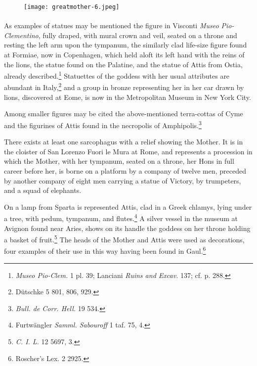 \documentclass[a4paper, 11pt, oneside, polutonikogreek, english]{article}
\begin{document}
\clearpage
\begin{landscape}
\begin{figure}[H]
\centering
\texttt{[image: greatmother-6.jpeg]}
\caption{}
\end{figure}
\end{landscape}
\clearpage
\paragraph{}
As examples of statues may be mentioned the figure in Visconti \emph{Museo Pio-Clementino}, fully draped, with mural crown and veil, seated on a throne and resting the left arm upon the tympanum, the similarly clad life-size figure found at Formiae, now in Copenhagen, which held aloft its left hand with the reins of the lions, the statue found on the Palatine, and the statue of Attis from Ostia, already described.\footnote{\emph{Museo Pio-Clem.} 1 pl. 39; Lanciani \emph{Ruins and Excav.} 137; cf. p. 288.} Statuettes of the goddess with her usual attributes are abundant in Italy,\footnote{Dütschke 5 801, 806, 929.} and a group in bronze representing her in her car drawn by lions, discovered at Eome, is now in the Metropolitan Museum in New York City.

Among smaller figures may be cited the above-mentioned terra-cottas of Cyme and the figurines of Attis found in the necropolis of Amphipolis.\footnote{\emph{Bull. de Corr. Hell.} 19 534.}

There exists at least one sarcophagus with a relief showing the Mother. It is in the cloister of San Lorenzo Fuori le Mura at Rome, and represents a procession in which the Mother, with her tympanum, seated on a throne, her Hons in full career before her, is borne on a platform by a company of twelve men, preceded by another company of eight men carrying a statue of Victory, by trumpeters, and a squad of elephants.

On a lamp from Sparta is represented Attis, clad in a Greek chlamys, lying under a tree, with pedum, tympanum, and flutes.\footnote{Furtwängler \emph{Samml. Sabouroff} 1 taf. 75, 4.} A silver vessel in the museum at Avignon found near Aries, shows on its handle the goddess on her throne holding a basket of fruit.\footnote{\emph{C. I. L.} 12 5697, 3.} The heads of the Mother and Attis were used as decorations, four examples of their use in this way having been found in Gaul.\footnote{Roscher's Lex. 2 2925.}
\end{document}
